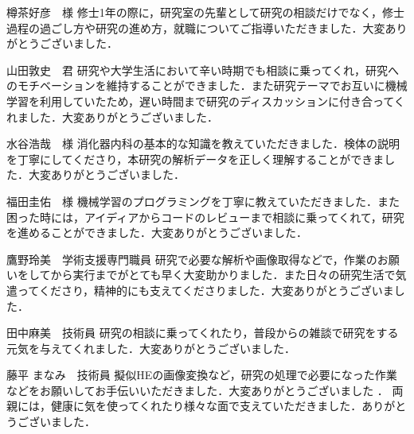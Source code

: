 樽茶好彦　様
修士1年の際に，研究室の先輩として研究の相談だけでなく，修士過程の過ごし方や研究の進め方，就職についてご指導いただきました．大変ありがとうございました．

山田敦史　君
研究や大学生活において辛い時期でも相談に乗ってくれ，研究へのモチベーションを維持することができました．また研究テーマでお互いに機械学習を利用していたため，遅い時間まで研究のディスカッションに付き合ってくれました．大変ありがとうございました．

水谷浩哉　様
消化器内科の基本的な知識を教えていただきました．検体の説明を丁寧にしてくださり，本研究の解析データを正しく理解することができました．大変ありがとうございました．

福田圭佑　様
機械学習のプログラミングを丁寧に教えていただきました．また困った時には，アイディアからコードのレビューまで相談に乗ってくれて，研究を進めることができました．大変ありがとうございました．

鷹野玲美　学術支援専門職員
研究で必要な解析や画像取得などで，作業のお願いをしてから実行までがとても早く大変助かりました．また日々の研究生活で気遣ってくださり，精神的にも支えてくださりました．大変ありがとうございました．

田中麻美　技術員
研究の相談に乗ってくれたり，普段からの雑談で研究をする元気を与えてくれました．大変ありがとうございました．

藤平 まなみ　技術員
擬似HEの画像変換など，研究の処理で必要になった作業などをお願いしてお手伝いいただきました．大変ありがとうございました
．
両親には，健康に気を使ってくれたり様々な面で支えていただきました．ありがとうございました．
